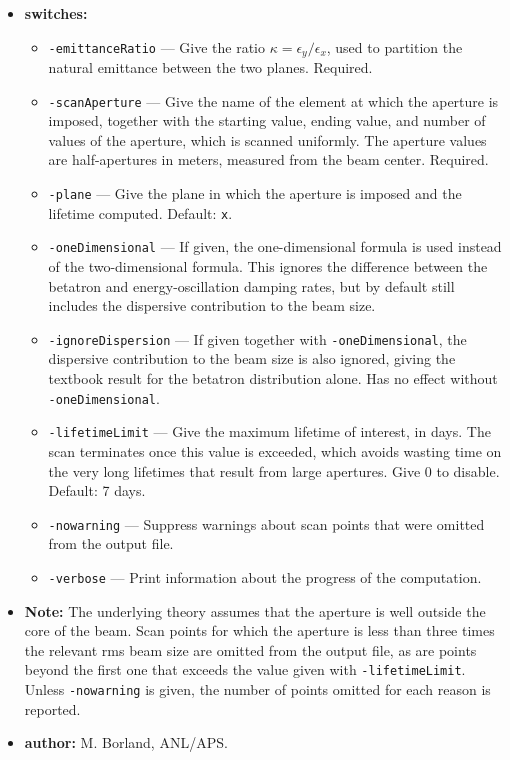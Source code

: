\documentclass[11pt]{article}
\begin{document}
\begin{itemize}
\item {\bf switches:}
\begin{itemize}
\item {\tt -emittanceRatio} --- Give the ratio $\kappa = \epsilon_y/\epsilon_x$, used to partition the
natural emittance between the two planes.  Required.
\item {\tt -scanAperture} --- Give the name of the element at which the aperture is imposed, together with
the starting value, ending value, and number of values of the aperture, which is scanned uniformly.  The
aperture values are half-apertures in meters, measured from the beam center.  Required.
\item {\tt -plane} --- Give the plane in which the aperture is imposed and the lifetime computed.
Default: {\tt x}.
\item {\tt -oneDimensional} --- If given, the one-dimensional formula is used instead of the
two-dimensional formula.  This ignores the difference between the betatron and energy-oscillation damping
rates, but by default still includes the dispersive contribution to the beam size.
\item {\tt -ignoreDispersion} --- If given together with {\tt -oneDimensional}, the dispersive contribution
to the beam size is also ignored, giving the textbook result for the betatron distribution alone.  Has no
effect without {\tt -oneDimensional}.
\item {\tt -lifetimeLimit} --- Give the maximum lifetime of interest, in days.  The scan terminates once
this value is exceeded, which avoids wasting time on the very long lifetimes that result from large
apertures.  Give 0 to disable.  Default: 7 days.
\item {\tt -nowarning} --- Suppress warnings about scan points that were omitted from the output file.
\item {\tt -verbose} --- Print information about the progress of the computation.
\end{itemize}

\item {\bf Note:} The underlying theory assumes that the aperture is well outside the core of the beam.
Scan points for which the aperture is less than three times the relevant rms beam size are omitted from the
output file, as are points beyond the first one that exceeds the value given with {\tt -lifetimeLimit}.
Unless {\tt -nowarning} is given, the number of points omitted for each reason is reported.

\item {\bf author:} M. Borland, ANL/APS.

\end{itemize}
\end{document}
